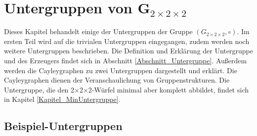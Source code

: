 \documentclass[12pt,a4paper, usenames, dvipsnames]{article}
\theoremstyle{mystyle}
\theoremstyle{definition}
\newcommand{\Gtwo}{\ensuremath{G_{2\times 2\times 2}}}
\newcommand{\Ttwo}{2$\times$2$\times$2-}
\begin{document}
\section{Untergruppen von G$_{2\times 2\times 2}$}

\label{Kapitel_Untergruppen}

Dieses Kapitel behandelt einige der Untergruppen der Gruppe $(\Gtwo, \circ)$. Im ersten Teil wird auf die trivialen Untergruppen eingegangen, zudem werden noch weitere Untergruppen beschrieben.
Die Definition und Erklärung der Untergruppe und des Erzeugers findet sich in Abschnitt \ref{Abschnitt_Untergruppe}.
Außerdem werden die Cayleygraphen zu zwei Untergruppen dargestellt und erklärt. Die Cayleygraphen dienen der Veranschaulichung von Gruppenstrukturen. Die Untergruppe, die den \Ttwo Würfel minimal aber komplett abbildet, findet sich in Kapitel \ref{Kapitel_MinUntergruppe}.

%
%
%
%
%
%
%
%
%
%
%
%
%
%
%
%
%
%
%
%
\subsection{Beispiel-Untergruppen}

\label{Abschnitt_UntergruppenBeispiele}
\end{document}
